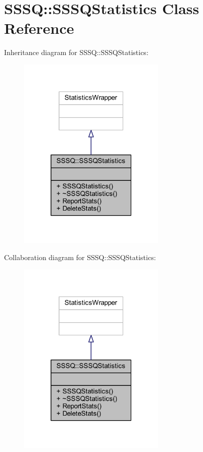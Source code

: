 \hypertarget{class_s_s_s_q_1_1_s_s_s_q_statistics}{}\section{S\+S\+SQ\+:\+:S\+S\+S\+Q\+Statistics Class Reference}
\label{class_s_s_s_q_1_1_s_s_s_q_statistics}


Inheritance diagram for S\+S\+SQ\+:\+:S\+S\+S\+Q\+Statistics\+:
\nopagebreak
\begin{figure}[H]
\begin{center}
\leavevmode
\includegraphics[width=199pt]{class_s_s_s_q_1_1_s_s_s_q_statistics__inherit__graph}
\end{center}
\end{figure}


Collaboration diagram for S\+S\+SQ\+:\+:S\+S\+S\+Q\+Statistics\+:
\nopagebreak
\begin{figure}[H]
\begin{center}
\leavevmode
\includegraphics[width=199pt]{class_s_s_s_q_1_1_s_s_s_q_statistics__coll__graph}
\end{center}
\end{figure}
